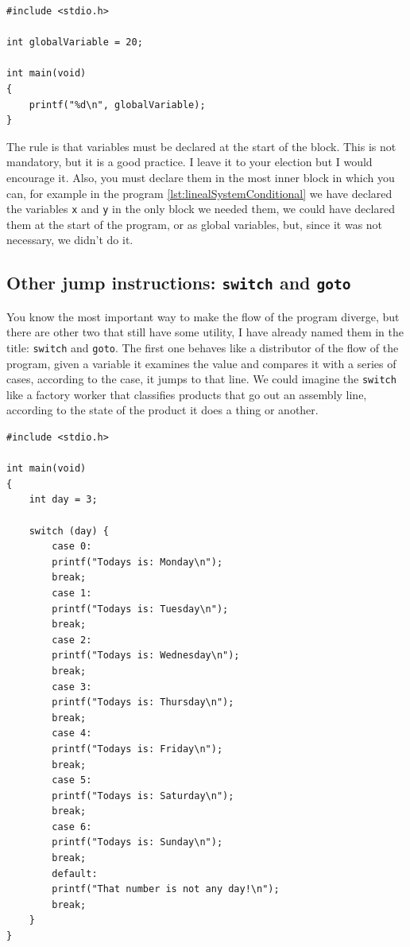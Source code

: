 \documentclass[a4paper]{article}
\begin{document}
\noindent
\begin{minipage}[H]{\linewidth}
\mbox{}
\begin{lstlisting}[style=C,
caption={Example of a program with a global variable},
label={lst:globalVar}]
#include <stdio.h>

int globalVariable = 20;

int main(void)
{
    printf("%d\n", globalVariable);
}
\end{lstlisting}
\end{minipage}

The rule is that variables must be declared at the start of the block. This is
not mandatory, but it is a good practice. I leave it to your election but I
would encourage it.
Also, you must declare them in the most inner block in which you can, for
example in the program \ref{lst:linealSystemConditional} we have declared
the variables \texttt{x} and \texttt{y} in the only block we needed them, we
could have declared them at the start of the program, or as global variables,
but, since it was not necessary, we didn't do it.

\subsection{Other jump instructions: \texttt{switch} and \texttt{goto}}
You know the most important way to make the flow of the program diverge, but
there are other two that still have some utility, I have already named them in
the title: \texttt{switch} and \texttt{goto}. The first one behaves like a
distributor of the flow of the program, given a variable it examines the value
and compares it with a series of cases, according to the case, it jumps to that
line. We could imagine the \texttt{switch} like a factory worker that classifies
products that go out an assembly line, according to the state of the product it
does a thing or another.

\noindent
\begin{minipage}[H]{\linewidth}
\mbox{}
\begin{lstlisting}[style=C,
caption={Example of a program with a \texttt{switch}},
label={lst:switchExample}]
#include <stdio.h>

int main(void)
{
    int day = 3;

    switch (day) {
        case 0:
        printf("Todays is: Monday\n");
        break;
        case 1:
        printf("Todays is: Tuesday\n");
        break;
        case 2:
        printf("Todays is: Wednesday\n");
        break;
        case 3:
        printf("Todays is: Thursday\n");
        break;
        case 4:
        printf("Todays is: Friday\n");
        break;
        case 5:
        printf("Todays is: Saturday\n");
        break;
        case 6:
        printf("Todays is: Sunday\n");
        break;
        default:
        printf("That number is not any day!\n");
        break;
    }
}
\end{lstlisting}
\end{minipage}
\end{document}
